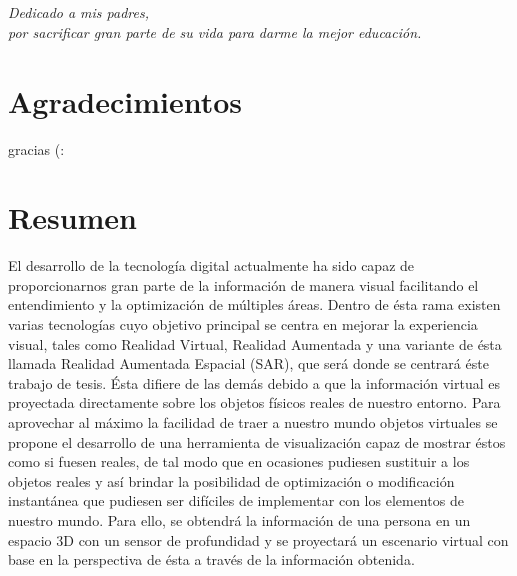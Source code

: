 \documentclass[a4paper,openright,12pt]{report}
\begin{document}
\chapter*{}
\begin{flushright}
\textit{Dedicado a mis padres, \\ por sacrificar gran parte de su vida para darme la mejor educación.\\}
\end{flushright}

\chapter*{Agradecimientos}

gracias (:

\chapter*{Resumen}

El desarrollo de la tecnología digital actualmente ha sido capaz de proporcionarnos gran parte de la información de manera visual facilitando el entendimiento y la optimización de múltiples áreas. Dentro de ésta rama existen varias tecnologías cuyo objetivo principal se centra en mejorar la experiencia visual, tales como Realidad Virtual, Realidad Aumentada y una variante de ésta llamada Realidad Aumentada Espacial (SAR), que será donde se centrará éste trabajo de tesis. Ésta difiere de las demás debido a que la información virtual es proyectada directamente sobre los objetos físicos reales de nuestro entorno. Para aprovechar al máximo la facilidad de traer a nuestro mundo objetos virtuales se propone el desarrollo de una herramienta de visualización capaz de mostrar éstos como si fuesen reales, de tal modo que en ocasiones pudiesen sustituir a los objetos reales y así brindar la posibilidad de optimización o modificación instantánea que pudiesen ser difíciles de implementar con los elementos de nuestro mundo. Para ello, se obtendrá la información de una persona en un espacio 3D con un sensor de profundidad y se proyectará un escenario virtual con base en la perspectiva de ésta a través de la información obtenida.


\tableofcontents
\cleardoublepage
{}
\listoffigures
\cleardoublepage
{}
\listoftables
\end{document}
